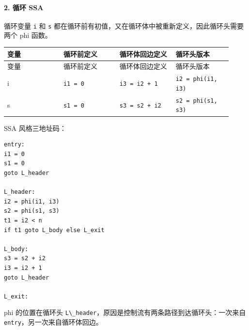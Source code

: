 \documentclass[UTF8]{ctexart}
\begin{document}
\paragraph*{2. 循环 SSA}

循环变量 \texttt{i} 和 \texttt{s} 都在循环前有初值，又在循环体中被重新定义，因此循环头需要两个 phi 函数。

\begin{longtable}{|p{0.23\linewidth}|p{0.23\linewidth}|p{0.23\linewidth}|p{0.23\linewidth}|}
\hline
变量 & 循环前定义 & 循环体回边定义 & 循环头版本 \\
\hline
\endfirsthead
变量 & 循环前定义 & 循环体回边定义 & 循环头版本 \\
\hline
\endhead
i & \texttt{i1 = 0} & \texttt{i3 = i2 + 1} & \texttt{i2 = phi(i1, i3)} \\
\hline
s & \texttt{s1 = 0} & \texttt{s3 = s2 + i2} & \texttt{s2 = phi(s1, s3)} \\
\hline
\end{longtable}

SSA 风格三地址码：

\begin{Verbatim}[fontsize=\small,breaklines=true]
entry:
i1 = 0
s1 = 0
goto L_header

L_header:
i2 = phi(i1, i3)
s2 = phi(s1, s3)
t1 = i2 < n
if t1 goto L_body else L_exit

L_body:
s3 = s2 + i2
i3 = i2 + 1
goto L_header

L_exit:
\end{Verbatim}

phi 的位置在循环头 \texttt{L\textbackslash{}\_header}，原因是控制流有两条路径到达循环头：一次来自 \texttt{entry}，另一次来自循环体回边。
\end{document}
